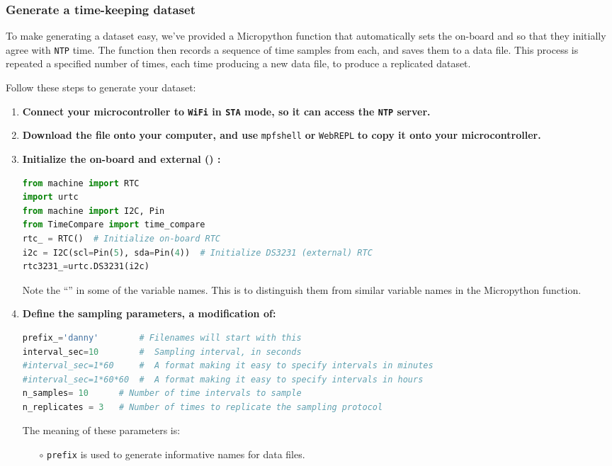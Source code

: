 \subsubsection{\howto Generate a time-keeping dataset}
To make generating a dataset easy, we’ve provided a Micropython function that automatically sets the on-board and  \rtcs so that they initially agree with \texttt{NTP} time.
The function then records a sequence of time samples from each, and saves them to a data file.
This process is repeated a specified number of times, each time producing a new data file, to produce a replicated dataset. 

Follow these steps to generate your dataset:
\begin{enumerate}
	\item \textbf{Connect your microcontroller to \texttt{WiFi} in \texttt{STA} mode, so it can access the \texttt{NTP} server.}
	\item \textbf{Download the file}  \textbf{ onto your computer, and use }\lstinline{mpfshell} \textbf{or} \lstinline{WebREPL} \textbf{to copy it onto your microcontroller.}
	\item \textbf{Initialize the on-board and external () \rtcs:}
\begin{lstlisting}[language=Python]
from machine import RTC
import urtc
from machine import I2C, Pin
from TimeCompare import time_compare
rtc_ = RTC()  # Initialize on-board RTC
i2c = I2C(scl=Pin(5), sda=Pin(4))  # Initialize DS3231 (external) RTC
rtc3231_=urtc.DS3231(i2c)
\end{lstlisting}
	Note the ``\textunderscore'' in some of the variable names. 
	This is to distinguish them from similar variable names in the Micropython function.
	\item \textbf{Define the sampling parameters, a modification of:}
\begin{lstlisting}[language=Python]
prefix_='danny'        # Filenames will start with this
interval_sec=10        #  Sampling interval, in seconds
#interval_sec=1*60     #  A format making it easy to specify intervals in minutes
#interval_sec=1*60*60  #  A format making it easy to specify intervals in hours
n_samples= 10      # Number of time intervals to sample
n_replicates = 3   # Number of times to replicate the sampling protocol
\end{lstlisting}
	The meaning of these parameters is:
	\begin{itemize}
		\item[$\circ$] \lstinline{prefix} is used to generate informative names for data files.
		

\end{itemize}
\end{enumerate}
